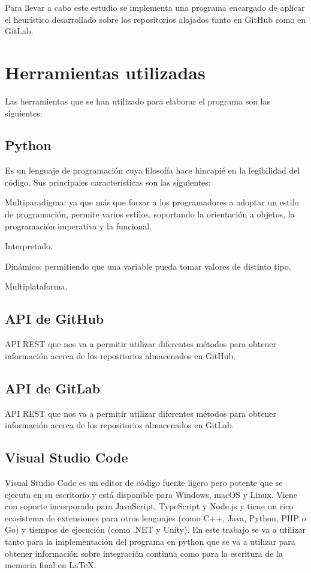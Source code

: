 Para llevar a cabo este estudio se implementa una programa encargado de aplicar el heurístico desarrollado sobre los repositorios alojados tanto en GitHub como en GitLab.

\section{Herramientas utilizadas}
Las herramientas que se han utilizado para elaborar el programa son las siguientes:
\subsection{Python}
Es un lenguaje de programación cuya filosofía hace hincapié en la legibilidad del código. Sus principales características son las siguientes:
\begin{compactitem}
    \item Multiparadigma: ya que más que forzar a los programadores a adoptar un estilo de programación, permite varios estilos, soportando la orientación a objetos, la programación imperativa y la funcional.
    \item Interpretado.
    \item Dinámico: permitiendo que una variable pueda tomar valores de distinto tipo.
    \item Multiplataforma.
\end{compactitem}

\subsection{API de GitHub}
API REST que nos va a permitir utilizar diferentes métodos para obtener información acerca de los repositorios almacenados en GitHub.

\subsection{API de GitLab}
API REST que nos va a permitir utilizar diferentes métodos para obtener información acerca de los repositorios almacenados en GitLab.

\subsection{Visual Studio Code}
Visual Studio Code es un editor de código fuente ligero pero potente que se ejecuta en su escritorio y está disponible para Windows, macOS y Linux. Viene con soporte incorporado para JavaScript, TypeScript y Node.js y tiene un rico ecosistema de extensiones para otros lenguajes  (como C++, Java, Python, PHP o Go) y tiempos de ejecución (como .NET y Unity).
En este trabajo se va a utilizar tanto para la implementación del programa en python que se va a utilizar para obtener información sobre integración continua como para la escritura de la memoria final en LaTeX.

